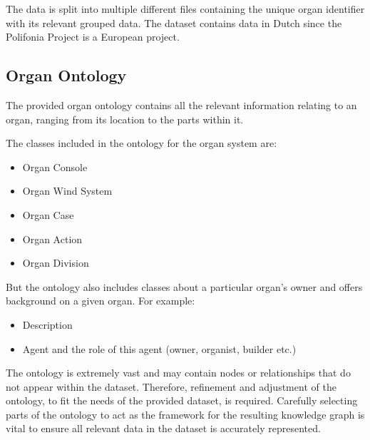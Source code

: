 The data is split into multiple different files containing the unique organ identifier with its relevant grouped data. The dataset contains data in Dutch since the Polifonia Project is a European project.

\subsection{Organ Ontology}
\hspace{0.5cm} The provided organ ontology \cite{organontology} contains all the relevant information relating to an organ, ranging from its location to the parts within it. 

\noindent The classes included in the ontology for the organ system are:

\vspace{-0.15cm}
\begin{itemize}
    \itemsep0em 
    \item Organ Console
    \vspace{-0.1cm}
    \item Organ Wind System
    \vspace{-0.1cm}
    \item Organ Case
    \vspace{-0.1cm}
    \item Organ Action
    \vspace{-0.1cm}
    \item Organ Division
\end{itemize}
\vspace{-0.15cm}

\noindent But the ontology also includes classes about a particular organ's owner and offers background on a given organ. For example:

\vspace{-0.15cm}
\begin{itemize}
    \itemsep0em 
\item Description
\vspace{-0.1cm}
\item Agent and the role of this agent (owner, organist, builder etc.)
\end{itemize}
\vspace{-0.15cm}

The ontology is extremely vast and may contain nodes or relationships that do not appear within the dataset. Therefore, refinement and adjustment of the ontology, to fit the needs of the provided dataset, is required. Carefully selecting parts of the ontology to act as the framework for the resulting knowledge graph is vital to ensure all relevant data in the dataset is accurately represented. 

